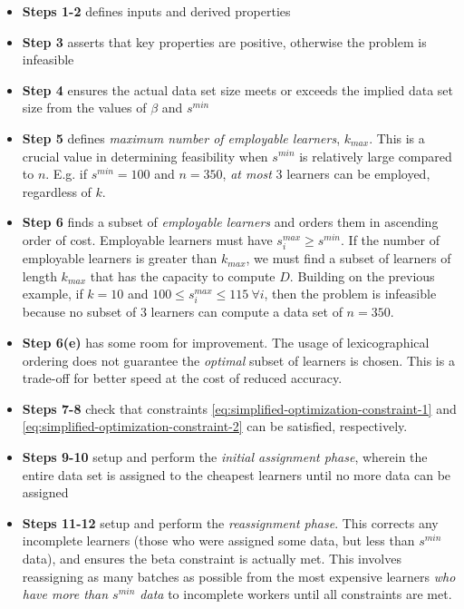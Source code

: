 \documentclass[../mthe-493-final-project.tex]{subfiles}
\begin{document}
    \begin{itemize}
        \item \textbf{Steps 1-2} defines inputs and derived properties
        \item \textbf{Step 3} asserts that key properties are positive, otherwise the problem is infeasible
        \item \textbf{Step 4} ensures the actual data set size meets or exceeds the implied data set size from the values of $\beta$ and $s^{min}$
        \item \textbf{Step 5} defines \textit{maximum number of employable learners}, $k_{max}$. This is a crucial value in determining feasibility when $s^{min}$ is relatively large compared to $n$. E.g. if $s^{min} = 100$ and $n = 350$, \textit{at most} 3 learners can be employed, regardless of $k$.
        \item \textbf{Step 6} finds a subset of \textit{employable learners} and orders them in ascending order of cost. Employable learners must have $s^{max}_i \geq s^{min}$. If the number of employable learners is greater than $k_{max}$, we must find a subset of learners of length $k_{max}$ that has the capacity to compute $D$. Building on the previous example, if $k = 10$ and $100 \leq s^{max}_i \leq 115 \ \forall i$, then the problem is infeasible because no subset of 3 learners can compute a data set of $n = 350$.
        \item \textbf{Step 6(e)} has some room for improvement. The usage of lexicographical ordering does not guarantee the \textit{optimal} subset of learners is chosen. This is a trade-off for better speed at the cost of reduced accuracy.
        \item \textbf{Steps 7-8} check that constraints \eqref{eq:simplified-optimization-constraint-1} and \eqref{eq:simplified-optimization-constraint-2} can be satisfied, respectively.
        \item \textbf{Steps 9-10} setup and perform the \textit{initial assignment phase}, wherein the entire data set is assigned to the cheapest learners until no more data can be assigned
        \item \textbf{Steps 11-12} setup and perform the \textit{reassignment phase}. This corrects any incomplete learners (those who were assigned some data, but less than $s^{min}$ data), and ensures the beta constraint is actually met. This involves reassigning as many batches as possible from the most expensive learners \textit{who have more than $s^{min}$ data} to incomplete workers until all constraints are met.
    \end{itemize}
    
\end{document}
